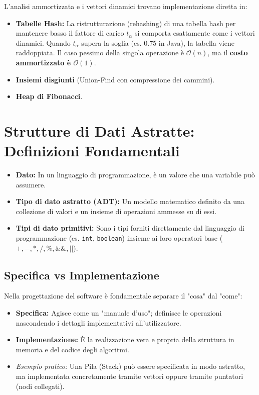 \documentclass[12pt, a4paper]{article}
\begin{document}
L'analisi ammortizzata e i vettori dinamici trovano implementazione diretta in:
\begin{itemize}
\item \textbf{Tabelle Hash:} La ristrutturazione (rehashing) di una tabella hash per mantenere basso il fattore di carico $t_\alpha$ si comporta esattamente come i vettori dinamici. Quando $t_\alpha$ supera la soglia (es. 0.75 in Java), la tabella viene raddoppiata. Il caso pessimo della singola operazione è $\mathcal{O}(n)$, ma il \textbf{costo ammortizzato è $\mathcal{O}(1)$}.
\item \textbf{Insiemi disgiunti} (Union-Find con compressione dei cammini).
\item \textbf{Heap di Fibonacci}.
\end{itemize}



\section{Strutture di Dati Astratte: Definizioni Fondamentali}

\begin{tcolorbox}[colback=lightergray!10, colframe=tocsec, title=\textbf{Definizioni: Dato e Tipo di Dato Astratto}]
\begin{itemize}
\item \textbf{Dato:} In un linguaggio di programmazione, è un valore che una variabile può assumere.
\item \textbf{Tipo di dato astratto (ADT):} Un modello matematico definito da una collezione di valori e un insieme di operazioni ammesse su di essi.
\item \textbf{Tipi di dato primitivi:} Sono i tipi forniti direttamente dal linguaggio di programmazione (es. \texttt{int}, \texttt{boolean}) insieme ai loro operatori base ($+, -, *, /, \%, \&\&, \vert{}\vert{}$).
\end{itemize}
\end{tcolorbox}

\subsection{Specifica vs Implementazione}
Nella progettazione del software è fondamentale separare il "cosa" dal "come":
\begin{itemize}
\item \textbf{Specifica:} Agisce come un "manuale d'uso"; definisce le operazioni nascondendo i dettagli implementativi all'utilizzatore.
\item \textbf{Implementazione:} È la realizzazione vera e propria della struttura in memoria e del codice degli algoritmi.
\item \textit{Esempio pratico:} Una Pila (Stack) può essere specificata in modo astratto, ma implementata concretamente tramite vettori oppure tramite puntatori (nodi collegati).
\end{itemize}
\end{document}
